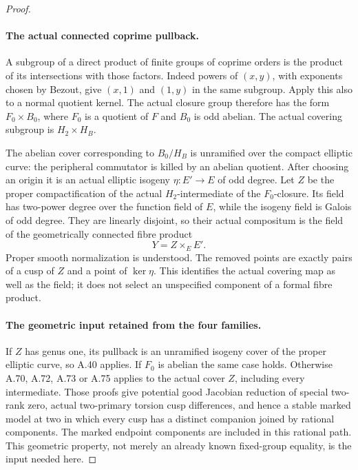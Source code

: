 \begin{proof}
\paragraph{The actual connected coprime pullback.}
A subgroup of a direct product of finite groups of coprime
orders is the product of its intersections with those
factors. Indeed powers of \((x,y)\), with exponents
chosen by Bezout, give \((x,1)\) and \((1,y)\) in the
same subgroup. Apply this also to a normal quotient kernel.
The actual closure group therefore has the form
\(F_0\times B_0\), where \(F_0\) is a quotient of
\(F\) and \(B_0\) is odd abelian. The actual covering
subgroup is \(H_2\times H_B\).

The abelian cover corresponding to \(B_0/H_B\) is
unramified over the compact elliptic curve: the peripheral
commutator is killed by an abelian quotient. After choosing
an origin it is an actual elliptic isogeny
\(\eta:E'\to E\) of odd degree. Let \(Z\) be the
proper compactification of the actual \(H_2\)-intermediate
of the \(F_0\)-closure. Its field has two-power degree
over the function field of \(E\), while the isogeny
field is Galois of odd degree. They are linearly disjoint,
so their actual compositum is the field of the geometrically
connected fibre product
\[
                              Y=Z\times_E E'.          \tag{A.76.3}
\]
Proper smooth normalization is understood. The removed
points are exactly pairs of a cusp of \(Z\) and a
point of \(\ker\eta\). This identifies the actual
covering map as well as the field; it does not select
an unspecified component of a formal fibre product.

\paragraph{The geometric input retained from the four families.}
If \(Z\) has genus one, its pullback is an unramified
isogeny cover of the proper elliptic curve, so A.40 applies.
If \(F_0\) is abelian the same case holds. Otherwise
A.70, A.72, A.73 or A.75 applies to the actual cover
\(Z\), including every intermediate. Those proofs give
potential good Jacobian reduction of special two-rank zero,
actual two-primary torsion cusp differences, and hence a
stable marked model at two in which every cusp has a
distinct companion joined by rational components. The
marked endpoint components are included in this rational
path. This geometric property, not merely an already
known fixed-group equality, is the input needed here.


\end{proof}
